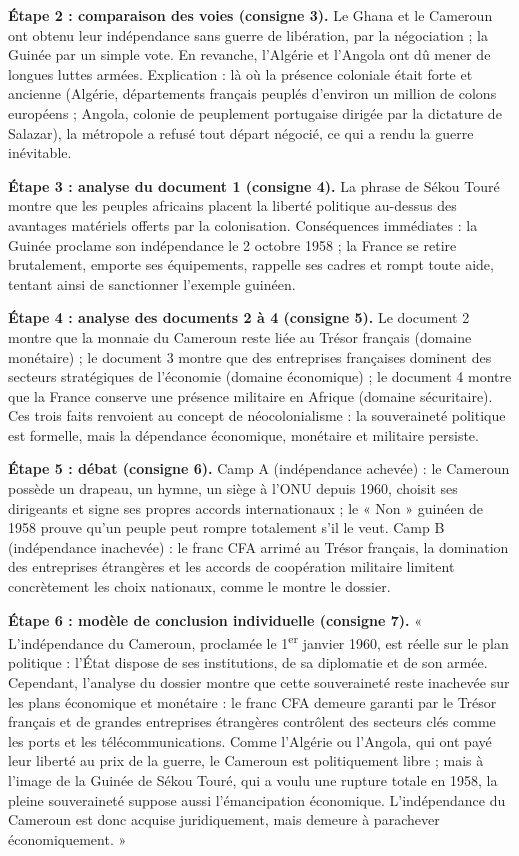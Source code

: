\documentclass[11pt]{article}
\newcommand{\cle}[1]{{\popxbold\color{popdark}#1}}
\begin{document}
\begin{exoresolu}
\tcblower

\textbf{Étape 2 : comparaison des voies (consigne 3).}
Le Ghana et le Cameroun ont obtenu leur indépendance sans guerre de libération, par la négociation ; la Guinée par un simple vote. En revanche, l'Algérie et l'Angola ont dû mener de longues luttes armées. Explication : là où la présence coloniale était forte et ancienne (Algérie, départements français peuplés d'environ un million de colons européens ; Angola, colonie de peuplement portugaise dirigée par la dictature de Salazar), la métropole a refusé tout départ négocié, ce qui a rendu la guerre inévitable.

\textbf{Étape 3 : analyse du document 1 (consigne 4).}
La phrase de Sékou Touré montre que les peuples africains placent la liberté politique au-dessus des avantages matériels offerts par la colonisation. Conséquences immédiates : la Guinée proclame son indépendance le 2 octobre 1958 ; la France se retire brutalement, emporte ses équipements, rappelle ses cadres et rompt toute aide, tentant ainsi de sanctionner l'exemple guinéen.

\textbf{Étape 4 : analyse des documents 2 à 4 (consigne 5).}
Le document 2 montre que la monnaie du Cameroun reste liée au Trésor français (domaine monétaire) ; le document 3 montre que des entreprises françaises dominent des secteurs stratégiques de l'économie (domaine économique) ; le document 4 montre que la France conserve une présence militaire en Afrique (domaine sécuritaire). Ces trois faits renvoient au concept de \cle{néocolonialisme} : la souveraineté politique est formelle, mais la dépendance économique, monétaire et militaire persiste.

\textbf{Étape 5 : débat (consigne 6).}
Camp A (indépendance achevée) : le Cameroun possède un drapeau, un hymne, un siège à l'ONU depuis 1960, choisit ses dirigeants et signe ses propres accords internationaux ; le « Non » guinéen de 1958 prouve qu'un peuple peut rompre totalement s'il le veut. Camp B (indépendance inachevée) : le franc CFA arrimé au Trésor français, la domination des entreprises étrangères et les accords de coopération militaire limitent concrètement les choix nationaux, comme le montre le dossier.

\textbf{Étape 6 : modèle de conclusion individuelle (consigne 7).}
« L'indépendance du Cameroun, proclamée le 1\textsuperscript{er} janvier 1960, est réelle sur le plan politique : l'État dispose de ses institutions, de sa diplomatie et de son armée. Cependant, l'analyse du dossier montre que cette souveraineté reste inachevée sur les plans économique et monétaire : le franc CFA demeure garanti par le Trésor français et de grandes entreprises étrangères contrôlent des secteurs clés comme les ports et les télécommunications. Comme l'Algérie ou l'Angola, qui ont payé leur liberté au prix de la guerre, le Cameroun est politiquement libre ; mais à l'image de la Guinée de Sékou Touré, qui a voulu une rupture totale en 1958, la pleine souveraineté suppose aussi l'émancipation économique. L'indépendance du Cameroun est donc acquise juridiquement, mais demeure à parachever économiquement. »


\end{exoresolu}
\end{document}
